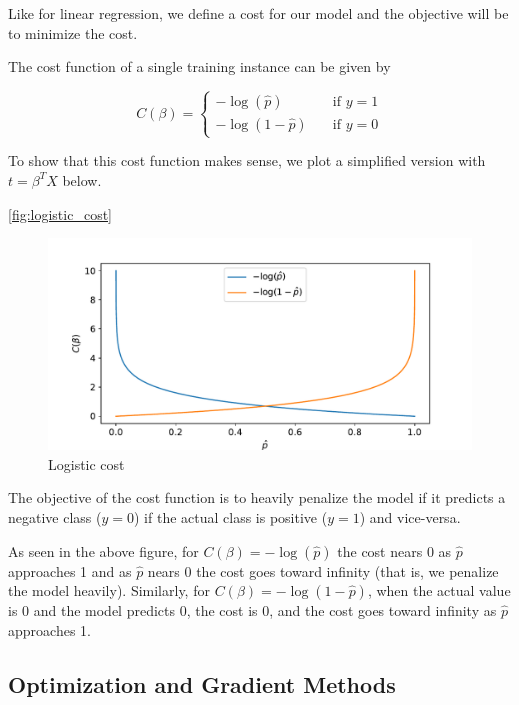 Like for linear regression, we define a cost for our model and the objective will be to minimize the cost.

The cost function of a single training instance can be given by

\begin{equation}
    C(\beta) = \begin{cases} - \log(\hat{p}) &\quad \text{if } y=1 \\ - \log(1-\hat{p}) &\quad \text{if } y=0  \end{cases}
\end{equation}

To show that this cost function makes sense, we plot a simplified version with $t=\beta^T X$ below.

\autoref{fig:logistic_cost}

\begin{figure}[H]
\begin{center}\includegraphics[scale=0.6]{latex/figures/logistic_cost_func.pdf}
\end{center}
\caption{Logistic cost}
\label{fig:logistic_cost}
\end{figure}

The objective of the cost function is to heavily penalize the model if it predicts a negative class ($y=0$) if the actual class is positive ($y=1$) and vice-versa. 

As seen in the above figure, for $C(\beta) = - \log(\hat{p})$ the cost nears 0 as $\hat{p}$ approaches 1 and as $\hat{p}$ nears 0 the cost goes toward infinity (that is, we penalize the model heavily). Similarly, for $C(\beta) = - \log(1 - \hat{p})$, when the actual value is 0 and the model predicts 0, the cost is 0, and the cost goes toward infinity as $\hat{p}$ approaches 1.


\subsection{Optimization and Gradient Methods}\label{sec:optim theory}

